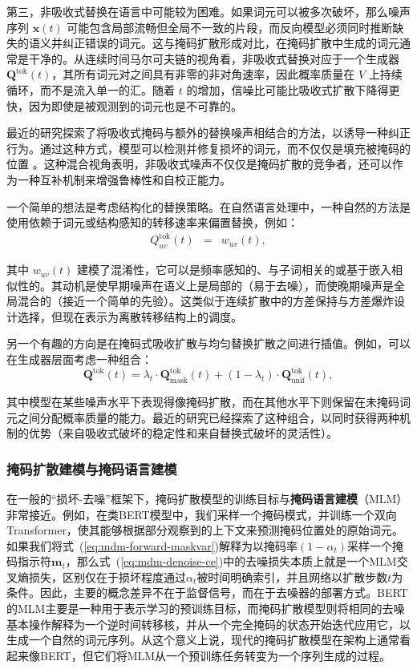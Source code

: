 \documentclass[UTF8,a4paper,zihao=-4,oneside,openany]{ctexbook}
\begin{document}
第三，非吸收式替换在语言中可能较为困难。如果词元可以被多次破坏，那么噪声序列 $\mathbf{x}(t)$ 可能包含局部流畅但全局不一致的片段，而反向模型必须同时推断缺失的语义并纠正错误的词元。这与掩码扩散形成对比，在掩码扩散中生成的词元通常是干净的。从连续时间马尔可夫链的视角看，非吸收式替换对应于一个生成器 $\mathbf{Q}^{\mathrm{tok}}(t)$，其所有词元对之间具有非零的非对角速率，因此概率质量在 $V$ 上持续循环，而不是流入单一的汇。随着 $t$ 的增加，信噪比可能比吸收式扩散下降得更快，因为即使是被观测到的词元也是不可靠的。

最近的研究探索了将吸收式掩码与额外的替换噪声相结合的方法，以诱导一种纠正行为。通过这种方式，模型可以检测并修复损坏的词元，而不仅仅是填充被掩码的位置 \citep{zhang-etal:2025corrective,rutte-etal:2025generalized}。这种混合视角表明，非吸收式噪声不仅仅是掩码扩散的竞争者，还可以作为一种互补机制来增强鲁棒性和自校正能力。

一个简单的想法是考虑结构化的替换策略。在自然语言处理中，一种自然的方法是使用依赖于词元或结构感知的转移速率来偏置替换，例如：
\begin{eqnarray}
Q^{\mathrm{tok}}_{uv}(t) & = & w_{uv}(t),
\end{eqnarray}

\noindent 其中 $w_{uv}(t)$ 建模了混淆性，它可以是频率感知的、与子词相关的或基于嵌入相似性的。其动机是使早期噪声在语义上是局部的（易于去噪），而使晚期噪声是全局混合的（接近一个简单的先验）。这类似于连续扩散中的方差保持与方差爆炸设计选择，但现在表示为离散转移结构上的调度。

另一个有趣的方向是在掩码式吸收扩散与均匀替换扩散之间进行插值。例如，可以在生成器层面考虑一种组合：
\begin{equation}
\mathbf{Q}^{\mathrm{tok}}(t) = \lambda_t \cdot \mathbf{Q}_{\text{mask}}^{\mathrm{tok}}(t) + (1-\lambda_t) \cdot \mathbf{Q}_{\text{unif}}^{\mathrm{tok}}(t),
\end{equation}

\noindent 其中模型在某些噪声水平下表现得像掩码扩散，而在其他水平下则保留在未掩码词元之间分配概率质量的能力。最近的研究已经探索了这种组合，以同时获得两种机制的优势（来自吸收式破坏的稳定性和来自替换式破坏的灵活性）。
\subsubsection{掩码扩散建模与掩码语言建模}

在一般的“损坏-去噪”框架下，掩码扩散模型的训练目标与\textbf{掩码语言建模}（MLM）非常接近。例如，在类BERT模型中，我们采样一个掩码模式，并训练一个双向Transformer，使其能够根据部分观察到的上下文来预测掩码位置处的原始词元\citep{devlin-etal:2019bert}。如果我们将式~(\ref{eq:mdm-forward-maskvar})解释为以掩码率$(1-\alpha_t)$采样一个掩码指示符$\mathbf{m}_t$，那么式~(\ref{eq:mdm-denoise-ce})中的去噪损失本质上就是一个MLM交叉熵损失，区别仅在于损坏程度通过$\alpha_t$被时间明确索引，并且网络以扩散步数$t$为条件。因此，主要的概念差异不在于监督信号，而在于去噪器的部署方式。BERT的MLM主要是一种用于表示学习的预训练目标，而掩码扩散模型则将相同的去噪基本操作解释为一个逆时间转移核，并从一个完全掩码的状态开始迭代应用它，以生成一个自然的词元序列。从这个意义上说，现代的掩码扩散模型在架构上通常看起来像BERT，但它们将MLM从一个预训练任务转变为一个序列生成的过程。
\end{document}
